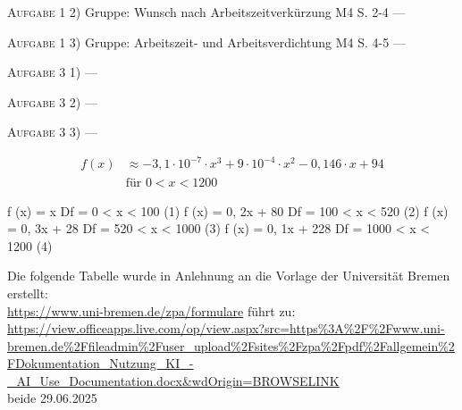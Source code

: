 \textsc{Aufgabe 1} 2) Gruppe: Wunsch nach Arbeitszeitverkürzung M4 S. 2-4 \quad ---

\textsc{Aufgabe 1} 3) Gruppe: Arbeitszeit- und Arbeitsverdichtung M4 S. 4-5 \quad ---


\textsc{Aufgabe 3} 1) \quad ---

\textsc{Aufgabe 3} 2) \quad ---

\textsc{Aufgabe 3} 3) \quad ---








\begin{align}
f(x) &\approx -3{,}1 \cdot 10^{-7} \cdot x^3 + 9 \cdot 10^{-4} \cdot x^2 - 0{,}146 \cdot x + 94 \\
     &\text{für } 0 < x < 1200
\end{align}

f (x) = x Df = {0 < x < 100} (1)
f (x) = 0, 2x + 80 Df = {100 < x < 520} (2)
f (x) = 0, 3x + 28 Df = {520 < x < 1000} (3)
f (x) = 0, 1x + 228 Df = {1000 < x < 1200} (4)




Die folgende Tabelle wurde in Anlehnung an die Vorlage der Universität Bremen erstellt:
\\

\footnotesize{
    \url{https://www.uni-bremen.de/zpa/formulare} führt zu: 
    \\

    \url{https://view.officeapps.live.com/op/view.aspx?src=https%3A%2F%2Fwww.uni-bremen.de%2Ffileadmin%2Fuser_upload%2Fsites%2Fzpa%2Fpdf%2Fallgemein%2FDokumentation_Nutzung_KI_-_AI_Use_Documentation.docx&wdOrigin=BROWSELINK} 
    \\
    
    beide 29.06.2025
    }

\clearpage
\newpage


